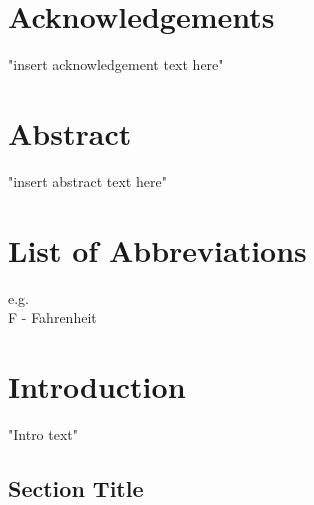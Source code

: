 \documentclass{ttuthes2015}
\newcommand{\tab}{\hspace*{2em}}  %
\begin{document}
\chapter{Acknowledgements}

\tab "insert acknowledgement text here"


\tableofcontents

\chapter{Abstract}

\tab "insert abstract text here"



\listoftables

\listoffigures

\chapter{List of Abbreviations}
e.g. \\
F - Fahrenheit \\




\mainmatter
\chapter{Introduction}  %


"Intro text"

\section{Section Title}  %
\end{document}
